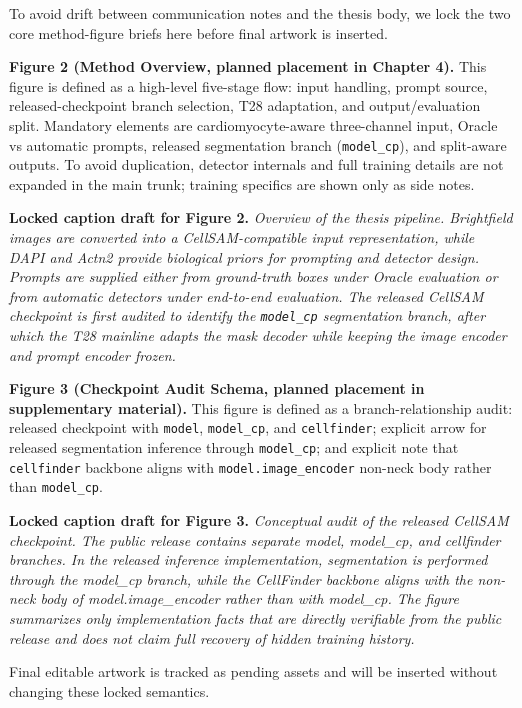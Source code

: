 To avoid drift between communication notes and the thesis body, we lock the two core method-figure briefs here before final artwork is inserted.

\textbf{Figure 2 (Method Overview, planned placement in Chapter 4).}
This figure is defined as a high-level five-stage flow: input handling, prompt source, released-checkpoint branch selection, T28 adaptation, and output/evaluation split. Mandatory elements are cardiomyocyte-aware three-channel input, Oracle vs automatic prompts, released segmentation branch (\texttt{model\_cp}), and split-aware outputs. To avoid duplication, detector internals and full training details are not expanded in the main trunk; training specifics are shown only as side notes.

\textbf{Locked caption draft for Figure 2.}
\emph{Overview of the thesis pipeline. Brightfield images are converted into a CellSAM-compatible input representation, while DAPI and Actn2 provide biological priors for prompting and detector design. Prompts are supplied either from ground-truth boxes under Oracle evaluation or from automatic detectors under end-to-end evaluation. The released CellSAM checkpoint is first audited to identify the \texttt{model\_cp} segmentation branch, after which the T28 mainline adapts the mask decoder while keeping the image encoder and prompt encoder frozen.}

\textbf{Figure 3 (Checkpoint Audit Schema, planned placement in supplementary material).}
This figure is defined as a branch-relationship audit: released checkpoint with \texttt{model}, \texttt{model\_cp}, and \texttt{cellfinder}; explicit arrow for released segmentation inference through \texttt{model\_cp}; and explicit note that \texttt{cellfinder} backbone aligns with \texttt{model.image\_encoder} non-neck body rather than \texttt{model\_cp}.

\textbf{Locked caption draft for Figure 3.}
\emph{Conceptual audit of the released CellSAM checkpoint. The public release contains separate model, model\_cp, and cellfinder branches. In the released inference implementation, segmentation is performed through the model\_cp branch, while the CellFinder backbone aligns with the non-neck body of model.image\_encoder rather than with model\_cp. The figure summarizes only implementation facts that are directly verifiable from the public release and does not claim full recovery of hidden training history.}

Final editable artwork is tracked as pending assets and will be inserted without changing these locked semantics.
